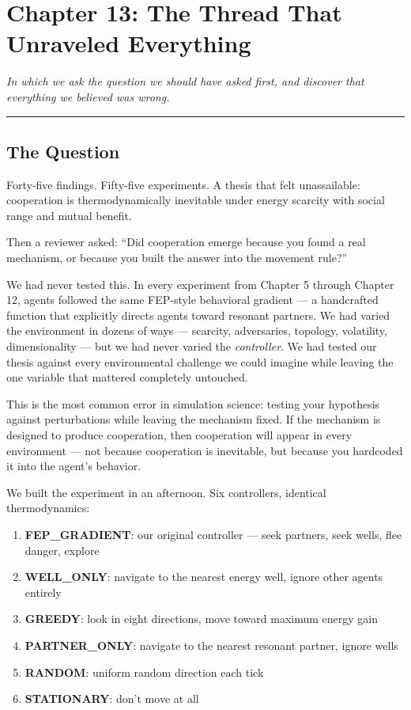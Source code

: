 \chapter{Chapter 13: The Thread That Unraveled Everything}\label{chapter-13-the-thread-that-unraveled-everything}

\emph{In which we ask the question we should have asked first, and discover that everything we believed was wrong.}

\begin{center}\rule{0.5\linewidth}{0.5pt}\end{center}

\section{The Question}\label{the-question}

Forty-five findings. Fifty-five experiments. A thesis that felt unassailable: cooperation is thermodynamically inevitable under energy scarcity with social range and mutual benefit.

Then a reviewer asked: ``Did cooperation emerge because you found a real mechanism, or because you built the answer into the movement rule?''

We had never tested this. In every experiment from Chapter 5 through Chapter 12, agents followed the same FEP-style behavioral gradient --- a handcrafted function that explicitly directs agents toward resonant partners. We had varied the environment in dozens of ways --- scarcity, adversaries, topology, volatility, dimensionality --- but we had never varied the \emph{controller}. We had tested our thesis against every environmental challenge we could imagine while leaving the one variable that mattered completely untouched.

This is the most common error in simulation science: testing your hypothesis against perturbations while leaving the mechanism fixed. If the mechanism is designed to produce cooperation, then cooperation will appear in every environment --- not because cooperation is inevitable, but because you hardcoded it into the agent's behavior.

We built the experiment in an afternoon. Six controllers, identical thermodynamics:

\begin{enumerate}
\def\labelenumi{\arabic{enumi}.}
\tightlist
\item
  \textbf{FEP\_GRADIENT}: our original controller --- seek partners, seek wells, flee danger, explore
\item
  \textbf{WELL\_ONLY}: navigate to the nearest energy well, ignore other agents entirely
\item
  \textbf{GREEDY}: look in eight directions, move toward maximum energy gain
\item
  \textbf{PARTNER\_ONLY}: navigate to the nearest resonant partner, ignore wells
\item
  \textbf{RANDOM}: uniform random direction each tick
\item
  \textbf{STATIONARY}: don't move at all
\end{enumerate}

